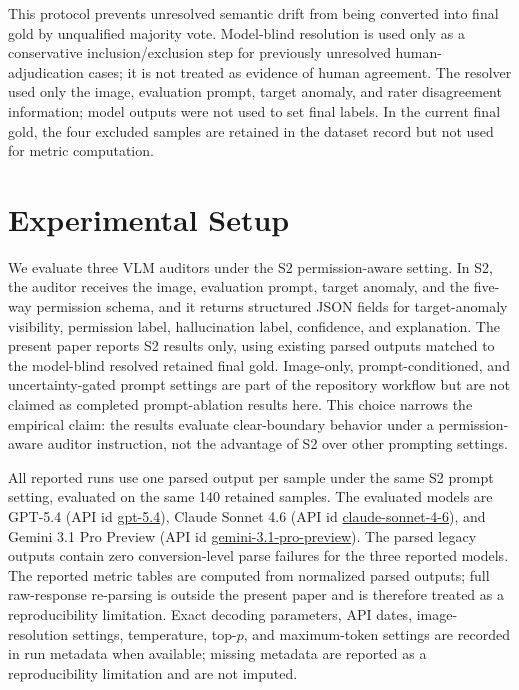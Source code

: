 \documentclass[runningheads]{llncs}
\begin{document}
This protocol prevents unresolved semantic drift from being converted into final gold by unqualified majority vote. Model-blind resolution is used only as a conservative inclusion/exclusion step for previously unresolved human-adjudication cases; it is not treated as evidence of human agreement. The resolver used only the image, evaluation prompt, target anomaly, and rater disagreement information; model outputs were not used to set final labels. In the current final gold, the four excluded samples are retained in the dataset record but not used for metric computation.

\section{Experimental Setup}

We evaluate three VLM auditors under the S2 permission-aware setting. In S2, the auditor receives the image, evaluation prompt, target anomaly, and the five-way permission schema, and it returns structured JSON fields for target-anomaly visibility, permission label, hallucination label, confidence, and explanation. The present paper reports S2 results only, using existing parsed outputs matched to the model-blind resolved retained final gold. Image-only, prompt-conditioned, and uncertainty-gated prompt settings are part of the repository workflow but are not claimed as completed prompt-ablation results here. This choice narrows the empirical claim: the results evaluate clear-boundary behavior under a permission-aware auditor instruction, not the advantage of S2 over other prompting settings.

All reported runs use one parsed output per sample under the same S2 prompt setting, evaluated on the same 140 retained samples. The evaluated models are GPT-5.4 (API id \url{gpt-5.4}), Claude Sonnet 4.6 (API id \url{claude-sonnet-4-6}), and Gemini 3.1 Pro Preview (API id \url{gemini-3.1-pro-preview}). The parsed legacy outputs contain zero conversion-level parse failures for the three reported models. The reported metric tables are computed from normalized parsed outputs; full raw-response re-parsing is outside the present paper and is therefore treated as a reproducibility limitation. Exact decoding parameters, API dates, image-resolution settings, temperature, top-$p$, and maximum-token settings are recorded in run metadata when available; missing metadata are reported as a reproducibility limitation and are not imputed.
\end{document}
